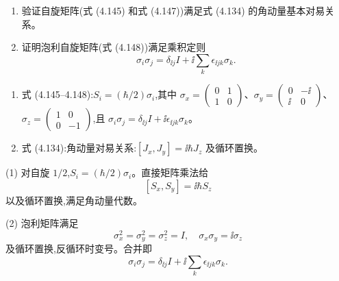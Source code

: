 \begin{question}
\begin{enumerate}
\item 验证自旋矩阵(式 (4.145) 和式 (4.147))满足式 (4.134) 的角动量基本对易关系。
\item 证明泡利自旋矩阵(式 (4.148))满足乘积定则
\[
\sigma_i\sigma_j=\delta_{\ii j}I+\ii\sum_k\epsilon_{\ii jk}\sigma_k.
\]
\end{enumerate}

\par\smallskip
{}
\begin{enumerate}[leftmargin=2.2em,itemsep=0.12em,topsep=0.12em,parsep=0pt]
\item 式 (4.145--4.148):$S_i=(\hbar/2)\sigma_i$,其中 $\sigma_x=\begin{pmatrix}0&1\\1&0\end{pmatrix}$、$\sigma_y=\begin{pmatrix}0&-\ii\\\ii&0\end{pmatrix}$、$\sigma_z=\begin{pmatrix}1&0\\0&-1\end{pmatrix}$,且 $\sigma_i\sigma_j=\delta_{\ii j}I+\ii\epsilon_{\ii jk}\sigma_k$。
\item 式 (4.134):角动量对易关系:$[J_x,J_y]=\ii\hbar J_z$ 及循环置换。
\end{enumerate}

\begin{solution}

(1) 对自旋 $1/2$,$S_i=(\hbar/2)\sigma_i$。直接矩阵乘法给
\[
[S_x,S_y]=\ii\hbar S_z
\]
以及循环置换,满足角动量代数。

(2) 泡利矩阵满足
\[
\sigma_x^2=\sigma_y^2=\sigma_z^2=I,
\quad \sigma_x\sigma_y=\ii\sigma_z
\]
及循环置换,反循环时变号。合并即
\[
\sigma_i\sigma_j=\delta_{\ii j}I+\ii\sum_k\epsilon_{\ii jk}\sigma_k.
\]

\end{solution}
\end{question}

